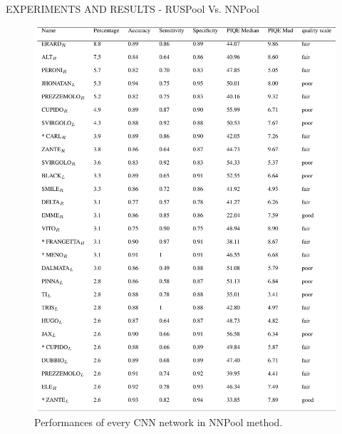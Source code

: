 \begin{frame}{EXPERIMENTS AND RESULTS - RUSPool Vs. NNPool}
\begin{minipage}{\linewidth}
\begin{minipage}{0.45\linewidth}
\begin{figure}[h!]
                \includegraphics[width =\linewidth]{images/paper10/NNPool performance.png}
                \centering
                \caption{Performances of every CNN network in NNPool method.}
                \label{fig: CNNNNPool perfromance}
            \end{figure}
        \end{minipage}
    \end{minipage}   
\end{frame}


